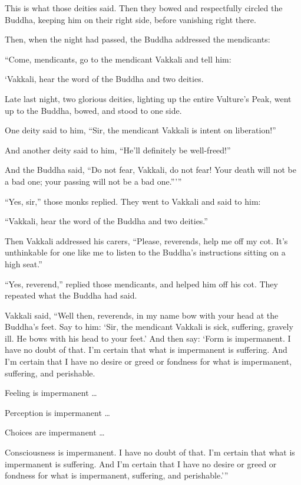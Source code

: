 \documentclass[12pt,openany]{book}%
\begin{document}
This is what those deities said. Then they bowed and respectfully circled the Buddha, keeping him on their right side, before vanishing right there. 

Then, when the night had passed, the Buddha addressed the mendicants: 

“Come, mendicants, go to the mendicant Vakkali and tell him: 

‘Vakkali, hear the word of the Buddha and two deities. 

Late last night, two glorious deities, lighting up the entire Vulture’s Peak, went up to the Buddha, bowed, and stood to one side. 

One deity said to him, “Sir, the mendicant Vakkali is intent on liberation!” 

And another deity said to him, “He’ll definitely be well-freed!” 

And the Buddha said, “Do not fear, Vakkali, do not fear! Your death will not be a bad one; your passing will not be a bad one.”’” 

“Yes, sir,” those monks replied. They went to Vakkali and said to him: 

“Vakkali, hear the word of the Buddha and two deities.” 

Then Vakkali addressed his carers, “Please, reverends, help me off my cot. It’s unthinkable for one like me to listen to the Buddha’s instructions sitting on a high seat.” 

“Yes, reverend,” replied those mendicants, and helped him off his cot. They repeated what the Buddha had said. 

Vakkali said, “Well then, reverends, in my name bow with your head at the Buddha’s feet. Say to him: ‘Sir, the mendicant Vakkali is sick, suffering, gravely ill. He bows with his head to your feet.’ And then say: ‘Form is impermanent. I have no doubt of that. I’m certain that what is impermanent is suffering. And I’m certain that I have no desire or greed or fondness for what is impermanent, suffering, and perishable. 

Feeling is impermanent … 

Perception is impermanent … 

Choices are impermanent … 

Consciousness is impermanent. I have no doubt of that. I’m certain that what is impermanent is suffering. And I’m certain that I have no desire or greed or fondness for what is impermanent, suffering, and perishable.’” 
\end{document}
